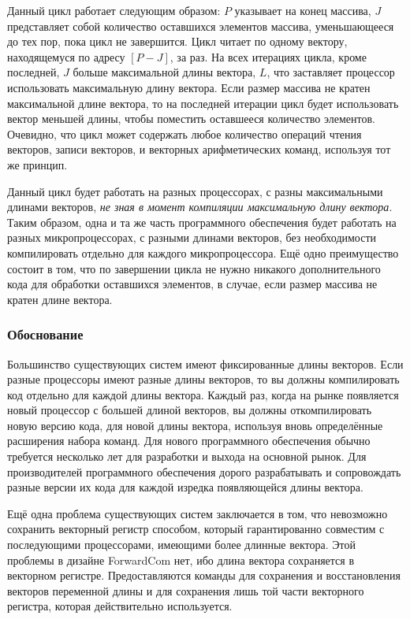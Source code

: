 \documentclass[forwardcom.tex]{subfiles}
\begin{document}
Данный цикл работает следующим образом: $P$ указывает на конец массива, $J$ представляет собой количество оставшихся элементов массива, уменьшающееся до тех пор, пока цикл не завершится. Цикл читает по одному вектору, находящемуся по адресу $[P-J]$, за раз. На всех итерациях цикла, кроме последней, $J$ больше максимальной длины вектора, $L$, что заставляет процессор использовать максимальную длину вектора. Если размер массива не кратен максимальной длине вектора, то на последней итерации цикл будет использовать вектор меньшей длины, чтобы поместить оставшееся количество элементов. Очевидно, что цикл может содержать любое количество операций чтения векторов, записи векторов, и векторных арифметических команд, используя тот же принцип.

Данный цикл будет работать на разных процессорах, с разны максимальными длинами векторов, \textit{не зная в момент компиляции максимальную длину вектора}. Таким образом, одна и та же часть программного обеспечения будет работать на разных микропроцессорах, с разными длинами векторов, без необходимости компилировать отдельно для каждого микропроцессора. Ещё одно преимущество состоит в том, что по завершении цикла не нужно никакого дополнительного кода для обработки оставшихся элементов, в случае, если размер массива не кратен длине вектора.

\subsubsection{Обоснование}
Большинство существующих систем имеют фиксированные длины векторов. Если разные процессоры имеют разные длины векторов, то вы должны компилировать код отдельно для каждой длины вектора. Каждый раз, когда на рынке появляется новый процессор с большей длиной векторов, вы должны откомпилировать новую версию кода, для новой длины вектора, используя вновь определённые расширения набора команд. Для нового программного обеспечения обычно требуется несколько лет для разработки и выхода на основной рынок. Для производителей программного обеспечения дорого разрабатывать и сопровождать разные версии их кода для каждой изредка появляющейся длины вектора.

Ещё одна проблема существующих систем заключается в том, что невозможно сохранить векторный регистр способом, который гарантированно совместим с последующими процессорами, имеющими более длинные вектора. Этой проблемы в дизайне ForwardCom нет, ибо длина вектора сохраняется в векторном регистре. Предоставляются команды для сохранения и восстановления векторов переменной длины и для сохранения лишь той части векторного регистра, которая действительно используется.
\end{document}
